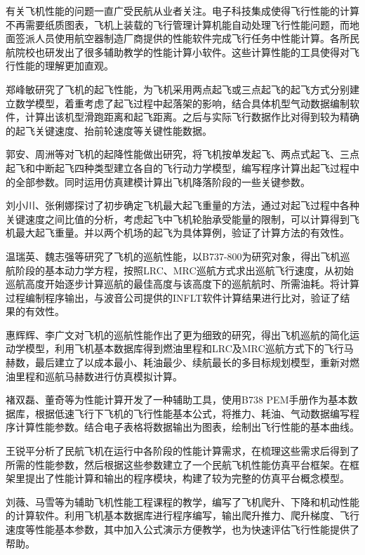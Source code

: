 \documentclass[a4paper,punct,space,heading=true,AutoFakeBold]{ctexrep}
\begin{document}
有关飞机性能的问题一直广受民航从业者关注。电子科技集成使得飞行性能的计算不再需要纸质图表，飞机上装载的飞行管理计算机能自动处理飞行性能问题，而地面签派人员使用航空器制造厂商提供的性能软件完成飞行任务中性能计算。各所民航院校也研发出了很多辅助教学的性能计算小软件。这些计算性能的工具使得对飞行性能的理解更加直观。

郑峰敏\cite{zhengfengmin}研究了飞机的起飞性能，为飞机采用两点起飞或三点起飞的起飞方式分别建立数学模型，着重考虑了起飞过程中起落架的影响，结合具体机型气动数据编制软件，计算出该机型滑跑距离和起飞距离。之后与实际飞行数据作比对得到较为精确的起飞关键速度、抬前轮速度等关键性能数据。

郭安、周洲等\cite{guoan}对飞机的起降性能做出研究，将飞机按单发起飞、两点式起飞、三点起飞和中断起飞四种类型建立各自的飞行动力学模型，编写程序计算出起飞过程中的全部参数。同时运用仿真建模计算出飞机降落阶段的一些关键参数。

刘小川、张俐娜\cite{liuxiaochuan}探讨了初步确定飞机最大起飞重量的方法，通过对起飞过程中各种关键速度之间比值的分析，考虑起飞中飞机轮胎承受能量的限制，可以计算得到飞机最大起飞重量。并以两个机场的起飞为具体算例，验证了计算方法的有效性。

温瑞英、魏志强等\cite{wenruiying}研究了飞机的巡航性能，以B737-800为研究对象，得出飞机巡航阶段的基本动力学方程，按照LRC、MRC巡航方式求出巡航飞行速度，从初始巡航高度开始逐步计算巡航的最佳高度与该高度下的巡航航时、所需油耗。将计算过程编制程序输出，与波音公司提供的INFLT软件计算结果进行比对，验证了结果的有效性。

惠辉辉、李广文\cite{huihuihui}对飞机的巡航性能作出了更为细致的研究，得出飞机巡航的简化运动学模型，利用飞机基本数据库得到燃油里程和LRC及MRC巡航方式下的飞行马赫数，最后建立了以成本最小、耗油最少、续航最长的多目标规划模型，重新对燃油里程和巡航马赫数进行仿真模拟计算。

褚双磊、董奇等\cite{chushaunglei}为性能计算开发了一种辅助工具，使用B738 PEM手册作为基本数据库，根据低速飞行下飞机的飞行性能基本公式，将推力、耗油、气动数据编写程序计算性能参数。结合电子表格将数据输出为图表，绘制出飞行性能的基本曲线。

王锐平\cite{wangruiping}分析了民航飞机在运行中各阶段的性能计算需求，在梳理这些需求后得到了所需的性能参数，然后根据这些参数建立了一个民航飞机性能仿真平台框架。在框架里提出了性能计算和输出的程序模块，构建了较为完整的仿真平台概念模型。

刘薇、马雪等\cite{liuwei}为辅助飞机性能工程课程的教学，编写了飞机爬升、下降和机动性能的计算软件。利用飞机基本数据库进行程序编写，输出爬升推力、爬升梯度、飞行速度等性能基本参数，其中加入公式演示方便教学，也为快速评估飞行性能提供了帮助。
\end{document}
